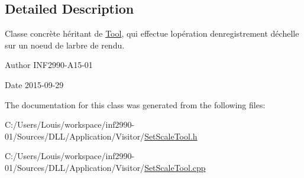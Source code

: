 \subsection{Detailed Description}
Classe concrète héritant de \hyperlink{class_tool}{Tool}, qui effectue l\textquotesingle{}opération d\textquotesingle{}enregistrement d\textquotesingle{}échelle sur un noeud de l\textquotesingle{}arbre de rendu. 

\begin{DoxyAuthor}{Author}
I\+N\+F2990-\/\+A15-\/01 
\end{DoxyAuthor}
\begin{DoxyDate}{Date}
2015-\/09-\/29 
\end{DoxyDate}


The documentation for this class was generated from the following files\+:\begin{DoxyCompactItemize}
\item 
C\+:/\+Users/\+Louis/workspace/inf2990-\/01/\+Sources/\+D\+L\+L/\+Application/\+Visitor/\hyperlink{_set_scale_tool_8h}{Set\+Scale\+Tool.\+h}\item 
C\+:/\+Users/\+Louis/workspace/inf2990-\/01/\+Sources/\+D\+L\+L/\+Application/\+Visitor/\hyperlink{_set_scale_tool_8cpp}{Set\+Scale\+Tool.\+cpp}\end{DoxyCompactItemize}
